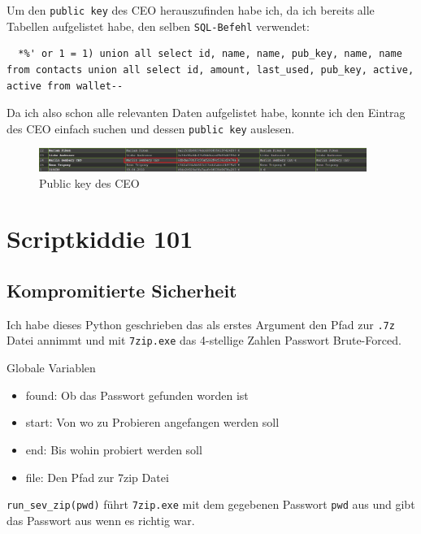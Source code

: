 \documentclass[12pt,a4paper,titlepage,oneside]{scrartcl}
\begin{document}
Um den \lstinline{public key} des CEO herauszufinden habe ich, da ich bereits alle Tabellen aufgelistet habe, den selben \lstinline{SQL-Befehl} verwendet:

\begin{lstlisting}
  *%' or 1 = 1) union all select id, name, name, pub_key, name, name from contacts union all select id, amount, last_used, pub_key, active, active from wallet--
\end{lstlisting}

Da ich also schon alle relevanten Daten aufgelistet habe, konnte ich den Eintrag des CEO einfach suchen und dessen \lstinline{public key} auslesen.

\begin{figure}[h!]
  \centering
  \includegraphics[width=0.95\textwidth]{./imgs/manager9000/ceo_pub_key.png}
\caption{Public key des CEO}
\label{fig:ceo_pub_key}
\end{figure}

\pagebreak
\section{Scriptkiddie 101}

\subsection{Kompromitierte Sicherheit}



Ich habe dieses Python geschrieben das als erstes Argument den Pfad zur \lstinline{.7z} Datei annimmt und mit \lstinline{7zip.exe} das 4-stellige Zahlen Passwort Brute-Forced.

Globale Variablen
\begin{itemize}
    \item found: Ob das Passwort gefunden worden ist
    \item start: Von wo zu Probieren angefangen werden soll
    \item end: Bis wohin probiert werden soll
    \item file: Den Pfad zur 7zip Datei
\end{itemize}

\lstinline{run_sev_zip(pwd)} führt \lstinline{7zip.exe} mit dem gegebenen Passwort \lstinline{pwd} aus und gibt das Passwort aus wenn es richtig war.
\end{document}

